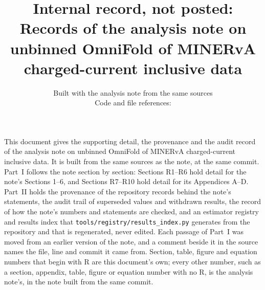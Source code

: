 \documentclass[11pt]{article}
\title{\textbf{Internal record, not posted:}\\
Records of the analysis note on unbinned OmniFold of MINERvA charged-current inclusive data} \author{} \date{Built with the analysis note from the same sources\\[4pt]\small Code and file references: \repolink}
\renewcommand{\thesection}{R\arabic{section}}
\begin{document}
\maketitle

\noindent This document gives the supporting detail, the provenance and the audit record of the analysis note on unbinned OmniFold of MINERvA charged-current inclusive data.
It is built from the same sources as the note, at the same commit.
Part~I follows the note section by section: Sections R1--R6 hold detail for the note's Sections 1--6, and Sections R7--R10 hold detail for its Appendices A--D.
Part~II holds the provenance of the repository records behind the note's statements, the audit trail of superseded values and withdrawn results, the record of how the note's numbers and statements are checked, and an estimator registry and results index that \texttt{tools/registry/results\_index.py} generates from the repository and that is regenerated, never edited.
Each passage of Part~I was moved from an earlier version of the note, and a comment beside it in the source names the file, line and commit it came from.
Section, table, figure and equation numbers that begin with R are this document's own; every other number, such as a section, appendix, table, figure or equation number with no R, is the analysis note's, in the note built from the same commit.

\setcounter{tocdepth}{2}
\tableofcontents

\renewcommand{\therecentry}{\thesection.\arabic{recentry}}
\newcommand{\recentrylabel}[1]{%
  \gdef\rectag{}\setcounter{rectags}{0}%
  \begingroup\def\texttt##1{\gdef\rectag{##1}\stepcounter{rectags}}\setbox0\hbox{#1}\endgroup
  \ifnum\value{rectags}=1 \else
    \PackageError{main_records}{a Section R1 entry label must hold exactly one typewriter tag, found
      \arabic{rectags}}{Each full-width entry of app_provenance.tex is labelled with one tag in typewriter type.}%
  \fi
  \refstepcounter{recentry}\label{rec:\rectag}\textbf{\therecentry}\enspace #1}
\end{document}
